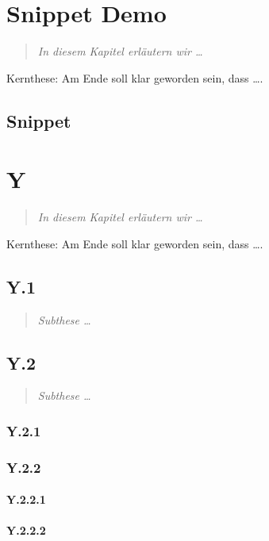 \documentclass[
  DIV=calc,
  BCOR=5mm,
  11pt,
  headings=small,
  oneside,
  abstract=true,
  toc=bib,
  english,ngerman]{scrbook}
\begin{document}
\chapter{Snippet Demo}
\begin{quote}\itshape
In diesem Kapitel erläutern wir \ldots
\end{quote} 

Kernthese: Am Ende soll klar geworden sein, dass \ldots.

\section{Snippet}


\chapter{Y}
\begin{quote}\itshape
In diesem Kapitel erläutern wir \ldots
\end{quote} 

Kernthese: Am Ende soll klar geworden sein, dass \ldots.

\section{Y.1}
\begin{quote}\itshape
Subthese \ldots
\end{quote} 

\section{Y.2}
\begin{quote}\itshape
Subthese \ldots
\end{quote} 

\subsection{Y.2.1}

\subsection{Y.2.2}

\subsubsection{Y.2.2.1}
\subsubsection{Y.2.2.2}
\end{document}
